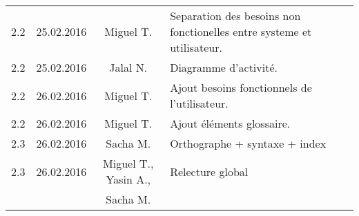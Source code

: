 \begin{adjustbox}{max width=\paperwidth}
\begin{tabular}{|c|c|c|m{7cm}|}
2.2 & 25.02.2016 & Miguel T. & Separation des besoins non fonctionelles entre systeme et utilisateur.\\
2.2 & 25.02.2016 & Jalal N. & Diagramme d'activité.\\
2.2 & 26.02.2016 & Miguel T. & Ajout besoins fonctionnels de l'utilisateur.\\
2.2 & 26.02.2016 & Miguel T. & Ajout éléments glossaire.\\
\hline
2.3 & 26.02.2016 & Sacha M. & Orthographe + syntaxe + index\\
2.3 & 26.02.2016 & Miguel T., Yasin A., & Relecture global\\
& & Sacha M.\\
\hline
\end{tabular}
\end{adjustbox}